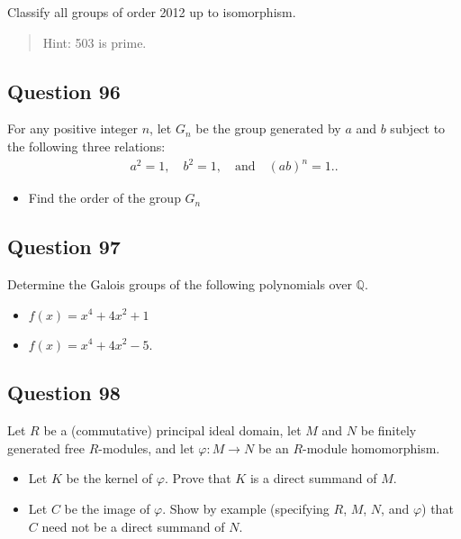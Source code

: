 \documentclass[12pt]{article}
\providecommand{\tightlist}{%
  \setlength{\itemsep}{0pt}\setlength{\parskip}{0pt}}
\begin{document}
Classify all groups of order 2012 up to isomorphism.

\begin{quote}
Hint: 503 is prime.
\end{quote}

\hypertarget{question-96}{%
\subsection{Question 96}\label{question-96}}

For any positive integer \(n\), let \(G_n\) be the group generated by
\(a\) and \(b\) subject to the following three relations: \begin{align*}
a^2=1, \quad b^2=1, \quad \text{and} \quad (ab)^n=1.
.\end{align*}

\begin{itemize}
\tightlist
\item
  Find the order of the group \(G_n\)
\end{itemize}

\hypertarget{question-97}{%
\subsection{Question 97}\label{question-97}}

Determine the Galois groups of the following polynomials over
\(\mathbb Q\).

\begin{itemize}
\item
  \(f(x)=x^4+4x^2+1\)
\item
  \(f(x)=x^4+4x^2-5\).
\end{itemize}

\hypertarget{question-98}{%
\subsection{Question 98}\label{question-98}}

Let \(R\) be a (commutative) principal ideal domain, let \(M\) and \(N\)
be finitely generated free \(R\)-modules, and let
\(\varphi:M\rightarrow N\) be an \(R\)-module homomorphism.

\begin{itemize}
\item
  Let \(K\) be the kernel of \(\varphi\). Prove that \(K\) is a direct
  summand of \(M\).
\item
  Let \(C\) be the image of \(\varphi\). Show by example (specifying
  \(R\), \(M\), \(N\), and \(\varphi\)) that \(C\) need not be a direct
  summand of \(N\).
\end{itemize}
\end{document}
